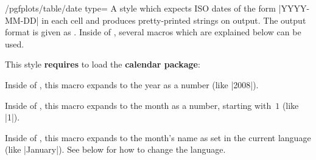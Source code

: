\begin{stylekey}{/pgfplots/table/date type=}%
    A style which expects ISO dates of the form |YYYY-MM-DD| in each cell and
    produces pretty-printed strings on output. The output format is given as
    . Inside of , several macros which are
    explained below can be used.
\begin{codeexample}[pre={\begin{lateximage}},post={\end{lateximage}}]

%

\hspace{1cm}
\end{codeexample}
    This style \textbf{requires} to load the \PGF{} \textbf{calendar package}:
\begin{codeexample}
\usepackage{pgfcalendar}
\end{codeexample}

    \begin{command}{\year}
        Inside of , this macro expands to the year as a
        number (like |2008|).
    \end{command}

    \begin{command}{\month}
        Inside of , this macro expands to the month as a
        number, starting with~$1$ (like |1|).
    \end{command}

    \begin{command}{\monthname}
        Inside of , this macro expands to the month's name as
        set in the current language (like |January|). See below for how to
        change the language.
    \end{command}


\end{stylekey}
